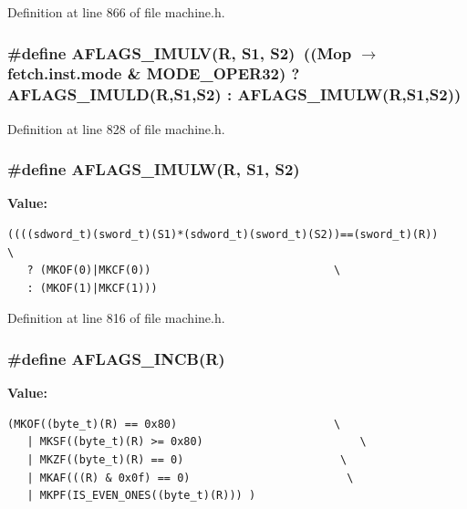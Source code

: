 Definition at line 866 of file machine.h.
\subsubsection[{AFLAGS\_\-IMULV}]{\setlength{\rightskip}{0pt plus 5cm}\#define AFLAGS\_\-IMULV(R, \/  S1, \/  S2)~((Mop $\rightarrow$ fetch.inst.mode \& MODE\_\-OPER32) ? AFLAGS\_\-IMULD(R,S1,S2) : AFLAGS\_\-IMULW(R,S1,S2))}\label{machine_8h_839be9a247062810bf63c1f25c095e13}




Definition at line 828 of file machine.h.
\subsubsection[{AFLAGS\_\-IMULW}]{\setlength{\rightskip}{0pt plus 5cm}\#define AFLAGS\_\-IMULW(R, \/  S1, \/  S2)}\label{machine_8h_b79f9b934aaa9a2d8a807a861975eb11}


\textbf{Value:}

\begin{Code}\begin{verbatim}((((sdword_t)(sword_t)(S1)*(sdword_t)(sword_t)(S2))==(sword_t)(R))    \
   ? (MKOF(0)|MKCF(0))                            \
   : (MKOF(1)|MKCF(1)))
\end{verbatim}
\end{Code}


Definition at line 816 of file machine.h.
\subsubsection[{AFLAGS\_\-INCB}]{\setlength{\rightskip}{0pt plus 5cm}\#define AFLAGS\_\-INCB(R)}\label{machine_8h_38fe5bde43c7d80bc6166e5812b05466}


\textbf{Value:}

\begin{Code}\begin{verbatim}(MKOF((byte_t)(R) == 0x80)                        \
   | MKSF((byte_t)(R) >= 0x80)                        \
   | MKZF((byte_t)(R) == 0)                        \
   | MKAF(((R) & 0x0f) == 0)                        \
   | MKPF(IS_EVEN_ONES((byte_t)(R))) )
\end{verbatim}
\end{Code}


